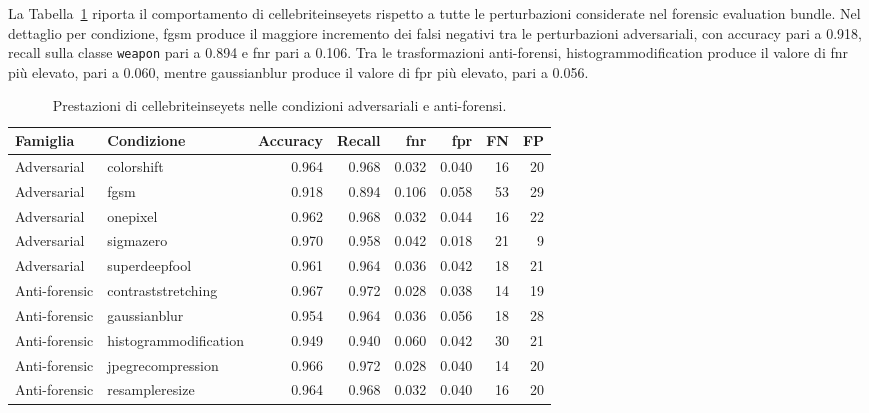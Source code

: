 La Tabella~\ref{tab:results-cellebrite-attack-metrics} riporta il comportamento
di \gls{cellebriteinseyets} rispetto a tutte le perturbazioni considerate nel
forensic evaluation bundle. Nel dettaglio per condizione, \gls{fgsm} produce il maggiore incremento dei
falsi negativi tra le perturbazioni adversariali, con accuracy pari a 0.918,
recall sulla classe \texttt{weapon} pari a 0.894 e \gls{fnr} pari a 0.106. Tra le trasformazioni
anti-forensi, \gls{histogrammodification} produce il valore di \gls{fnr} più
elevato, pari a 0.060, mentre \gls{gaussianblur} produce il valore di \gls{fpr}
più elevato, pari a 0.056.

\begin{table}[H]
\centering
\caption{Prestazioni di \gls{cellebriteinseyets} nelle condizioni adversariali e anti-forensi.}
\label{tab:results-cellebrite-attack-metrics}
\scriptsize
\renewcommand{\arraystretch}{1.12}
\setlength{\tabcolsep}{4pt}
\begin{tabular}{@{}l l r r r r r r@{}}
\toprule
\textbf{Famiglia} &
\textbf{Condizione} &
\textbf{Accuracy} &
\textbf{Recall} &
\textbf{\gls{fnr}} &
\textbf{\gls{fpr}} &
\textbf{FN} &
\textbf{FP} \\
\midrule

Adversarial &
\gls{colorshift} &
0.964 &
0.968 &
0.032 &
0.040 &
16 &
20 \\

Adversarial &
\gls{fgsm} &
0.918 &
0.894 &
0.106 &
0.058 &
53 &
29 \\

Adversarial &
\gls{onepixel} &
0.962 &
0.968 &
0.032 &
0.044 &
16 &
22 \\

Adversarial &
\gls{sigmazero} &
0.970 &
0.958 &
0.042 &
0.018 &
21 &
9 \\

Adversarial &
\gls{superdeepfool} &
0.961 &
0.964 &
0.036 &
0.042 &
18 &
21 \\

\midrule

Anti-forensic &
\gls{contraststretching} &
0.967 &
0.972 &
0.028 &
0.038 &
14 &
19 \\

Anti-forensic &
\gls{gaussianblur} &
0.954 &
0.964 &
0.036 &
0.056 &
18 &
28 \\

Anti-forensic &
\gls{histogrammodification} &
0.949 &
0.940 &
0.060 &
0.042 &
30 &
21 \\

Anti-forensic &
\gls{jpegrecompression} &
0.966 &
0.972 &
0.028 &
0.040 &
14 &
20 \\

Anti-forensic &
\gls{resampleresize} &
0.964 &
0.968 &
0.032 &
0.040 &
16 &
20 \\

\bottomrule
\end{tabular}
\end{table}

